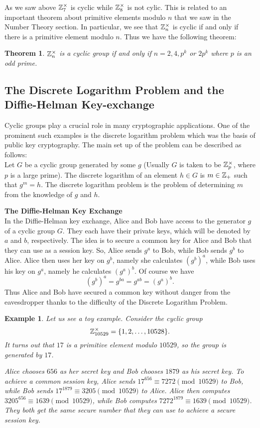 \documentclass[12pt]{article}
\theoremstyle{plain}
\newtheorem{example}{Example}
\newtheorem{theorem}{Theorem}
\theoremstyle{definition}
\theoremstyle{remark}
\begin{document}
As we saw above $\mathbb{Z}_{7}^{\times}$ is cyclic while $\mathbb{Z}_8^{\times}$ is not cylic. This is related to an important theorem about primitive elements modulo $n$ that we saw in the Number Theory section. In particular, we see that $\mathbb{Z}_n^{\times}$ is cyclic if and only if there is a primitive element modulo $n$. Thus we have the following theorem:
\begin{theorem}
$\mathbb{Z}_n^{\times}$ is a cyclic group if and only if $n=2, 4, p^k$ or $2p^k$ where $p$ is an odd prime.
\end{theorem}

\subsection{The Discrete Logarithm Problem and the Diffie-Helman Key-exchange}
Cyclic groups play a crucial role in many cryptographic applications. One of the prominent such examples is the discrete logarithm problem which was the basis of public key cryptography. The main set up of the problem can be described as follows:
\\
Let $G$ be a cyclic group generated by some $g$ (Usually $G$ is taken to be $\mathbb{Z}_p^{\times}$, where $p$ is a large prime).
The discrete logarithm of an element $h\in G$ is $m\in \mathbb{Z}_+$ such that $g^m=h$. The discrete logarithm problem is the problem of determining $m$ from the knowledge of $g$ and $h$.

\bigskip
\noindent
{\bf The Diffie-Helman Key Exchange}\\
In the Diffie-Helman key exchange, Alice and Bob have access to the generator $g$ of a cyclic group $G$. They each have their private keys, which will be denoted by $a$ and $b$, respectively. The idea is to secure a common key for Alice and Bob that they can use as a session key. So, Alice sends $g^a$ to Bob, while Bob sends $g^b$ to Alice. Alice then uses her key on $g^b$, namely she calculates
$(g^b)^a$, while Bob uses his key on $g^a$, namely he calculates $(g^a)^b$. Of course we have
$$(g^b)^a=g^{ba} = g^{ab}=(g^a)^b.$$
Thus Alice and Bob have secured a common key without danger from the eavesdropper thanks to the difficulty of the Discrete Logarithm Problem.

\begin{example}
Let us see a toy example. Consider the cyclic group
$$\mathbb{Z}_{10529}^{\times} = \{1, 2, \dots, 10528\}. $$
It turns out that $17$ is a primitive element modulo $10529$, so the group is generated by $17$.

Alice chooses $656$ as her secret key and Bob chooses $1879$ as his secret key. To achieve a common session key, Alice sends $17^{656} \equiv 7272 \pmod{10529}$ to Bob, while Bob sends $17^{1879} \equiv 3205 \pmod {10529}$ to Alice. Alice then computes $3205^{656} \equiv 1639 \pmod{10529}$, while Bob computes $7272^{1879} \equiv 1639 \pmod{10529}$. They both get the same secure number that they can use to achieve a secure session key.
\end{example}
\end{document}
